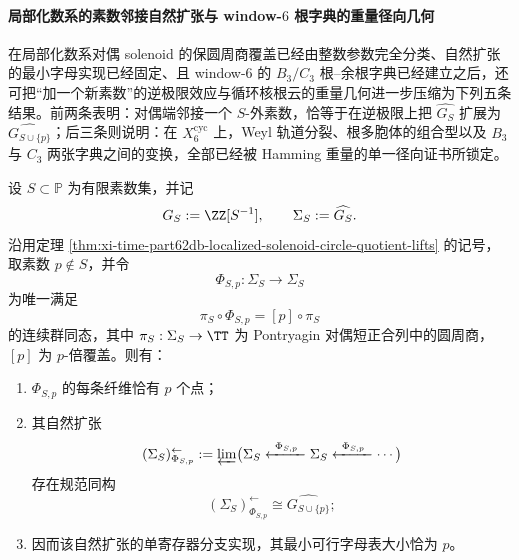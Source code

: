 \paragraph{局部化数系的素数邻接自然扩张与 window-\texorpdfstring{$6$}{6} 根字典的重量径向几何}
在局部化数系对偶 solenoid 的保圆周商覆盖已经由整数参数完全分类、自然扩张的最小字母实现已经固定、且 window-\(6\) 的 \(B_3/C_3\) 根--余根字典已经建立之后，还可把“加一个新素数”的逆极限效应与循环核根云的重量几何进一步压缩为下列五条结果。前两条表明：对偶端邻接一个 \(S\)-外素数，恰等于在逆极限上把 \(\widehat{G_S}\) 扩展为 \(\widehat{G_{S\cup\{p\}}}\)；后三条则说明：在 \(X_6^{\mathrm{cyc}}\) 上，Weyl 轨道分裂、根多胞体的组合型以及 \(B_3\) 与 \(C_3\) 两张字典之间的变换，全部已经被 Hamming 重量的单一径向证书所锁定。

\begin{theorem}\label{thm:xi-time-part62dea-localized-prime-adjunction-natural-extension}
设 \(S\subset \mathbb P\) 为有限素数集，并记
\[
G_S:=\ZZ[S^{-1}],
\qquad
\Sigma_S:=\widehat{G_S}.
\]
沿用定理 \ref{thm:xi-time-part62db-localized-solenoid-circle-quotient-lifts} 的记号，取素数 \(p\notin S\)，并令
\[
\Phi_{S,p}:\Sigma_S\to \Sigma_S
\]
为唯一满足
\[
\pi_S\circ \Phi_{S,p}=[p]\circ \pi_S
\]
的连续群同态，其中 \(\pi_S:\Sigma_S\to \TT\) 为 Pontryagin 对偶短正合列中的圆周商，\([p]\) 为 \(p\)-倍覆盖。则有：
\begin{enumerate}
  \item \(\Phi_{S,p}\) 的每条纤维恰有 \(p\) 个点；
  \item 其自然扩张
  \[
  (\Sigma_S)^{\leftarrow}_{\Phi_{S,p}}
  :=
  \varprojlim\bigl(
  \Sigma_S\xleftarrow{\ \Phi_{S,p}\ }
  \Sigma_S\xleftarrow{\ \Phi_{S,p}\ }\cdots
  \bigr)
  \]
  存在规范同构
  \[
  (\Sigma_S)^{\leftarrow}_{\Phi_{S,p}}
  \cong
  \widehat{G_{S\cup\{p\}}};
  \]
  \item 因而该自然扩张的单寄存器分支实现，其最小可行字母表大小恰为 \(p\)。
\end{enumerate}
\end{theorem}

